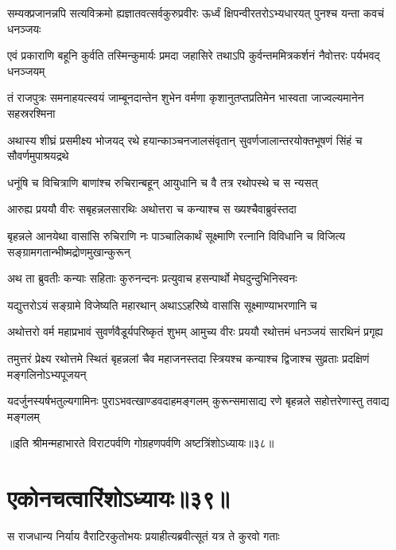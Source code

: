 \fourlineindentedshloka
{सम्यक्प्रजानन्नपि सत्यविक्रमो}
{ह्यज्ञातवत्सर्वकुरुप्रवीरः}
{ऊर्ध्वं क्षिपन्वीरतरोऽभ्यधारयत्}
{पुनश्च यन्ता कवचं धनञ्जयः}


\fourlineindentedshloka
{एवं प्रकाराणि बहूनि कुर्वति}
{तस्मिन्कुमार्यः प्रमदा जहासिरे}
{तथाऽपि कुर्वन्तममित्रकर्शनं}
{नैवोत्तरः पर्यभवद् धनञ्जयम्}


\fourlineindentedshloka
{तं राजपुत्रः समनाहयत्स्वयं}
{जाम्बूनदान्तेन शुभेन वर्मणा}
{कृशानुतप्तप्रतिमेन भास्वता}
{जाज्वल्यमानेन सहस्ररश्मिना}


\fourlineindentedshloka
{अथास्य शीघ्रं प्रसमीक्ष्य भोजयद्}
{रथे हयान्काञ्चनजालसंवृतान्}
{सुवर्णजालान्तरयोक्तभूषणं}
{सिंहं च सौवर्णमुपाश्रयद्रथे}


\twolineshloka
{धनूंषि च विचित्राणि बाणांश्च रुचिरान्बहून्}
{आयुधानि च वै तत्र रथोपस्थे च स न्यसत्}


\twolineshloka
{आरुह्य प्रययौ वीरः सबृहन्नलसारथिः}
{अथोत्तरा च कन्याश्च स ख्यश्चैवाब्रुवंस्तदा}


\threelineshloka
{बृहन्नले आनयेथा वासांसि रुचिराणि नः}
{पाञ्चालिकार्थं सूक्ष्माणि रत्नानि विविधानि च}
{विजित्य सङ्ग्रामगतान्भीष्मद्रोणमुखान्कुरून्}


\twolineshloka
{अथ ता ब्रुवतीः कन्याः सहिताः कुरुनन्दनः}
{प्रत्युवाच हसन्पार्थो मेघदुन्दुभिनिस्वनः}


\twolineshloka
{यद्युत्तरोऽयं सङ्ग्रामे विजेष्यति महारथान्}
{अथाऽऽहरिष्ये वासांसि सूक्ष्माण्याभरणानि च}



\fourlineindentedshloka
{अथोत्तरो वर्म महाप्रभावं}
{सुवर्णवैडूर्यपरिष्कृतं शुभम्}
{आमुच्य वीरः प्रययौ रथोत्तमं}
{धनञ्जयं सारथिनं प्रगृह्य}


\fourlineindentedshloka
{तमुत्तरं प्रेक्ष्य रथोत्तमे स्थितं}
{बृहन्नलां चैव महाजनस्तदा}
{स्त्रियश्च कन्याश्च द्विजाश्च सुव्रताः}
{प्रदक्षिणं मङ्गलिनोऽभ्यपूजयन्}


\fourlineindentedshloka
{यदर्जुनस्यर्षभतुल्यगामिनः}
{पुराऽभवत्खाण्डवदाहमङ्गलम्}
{कुरून्समासाद्य रणे बृहन्नले}
{सहोत्तरेणास्तु तवाद्य मङ्गलम्}

॥इति श्रीमन्महाभारते विराटपर्वणि गोग्रहणपर्वणि अष्टत्रिंशोऽध्यायः॥३८॥

\chapter{एकोनचत्वारिंशोऽध्यायः॥३९॥}

\twolineshloka
{स राजधान्य निर्याय वैराटिरकुतोभयः}
{प्रयाहीत्यब्रवीत्सूतं यत्र ते कुरवो गताः}


